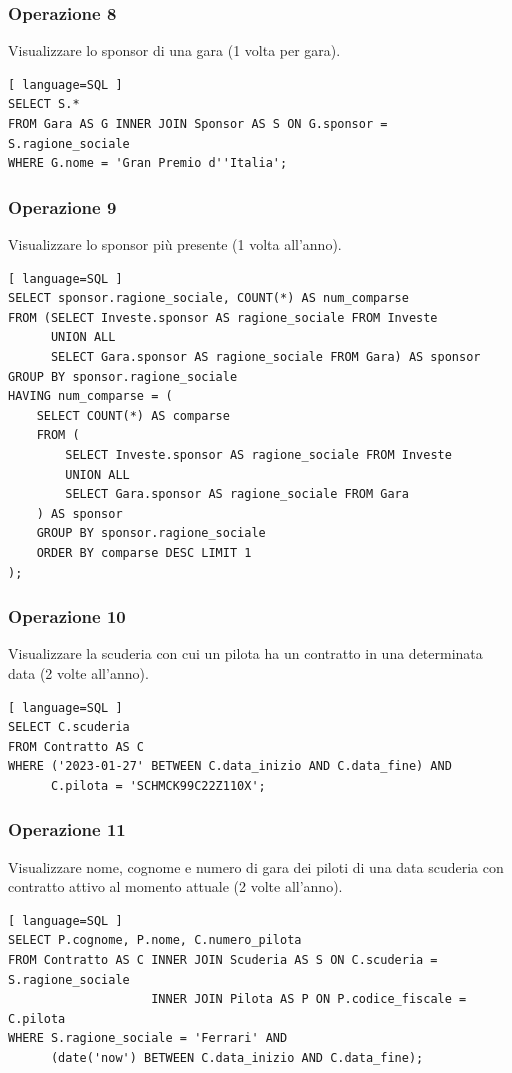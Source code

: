 \documentclass[11pt]{article}
\begin{document}
\subsubsection{Operazione 8}
Visualizzare lo sponsor di una gara (1 volta per gara).
\begin{lstlisting}[ language=SQL ]
SELECT S.*
FROM Gara AS G INNER JOIN Sponsor AS S ON G.sponsor = S.ragione_sociale
WHERE G.nome = 'Gran Premio d''Italia';
\end{lstlisting}


\subsubsection{Operazione 9}
Visualizzare lo sponsor più presente (1 volta all'anno).
\begin{lstlisting}[ language=SQL ]
SELECT sponsor.ragione_sociale, COUNT(*) AS num_comparse
FROM (SELECT Investe.sponsor AS ragione_sociale FROM Investe 
      UNION ALL 
      SELECT Gara.sponsor AS ragione_sociale FROM Gara) AS sponsor
GROUP BY sponsor.ragione_sociale
HAVING num_comparse = (
    SELECT COUNT(*) AS comparse
    FROM (
        SELECT Investe.sponsor AS ragione_sociale FROM Investe 
        UNION ALL 
        SELECT Gara.sponsor AS ragione_sociale FROM Gara
    ) AS sponsor
    GROUP BY sponsor.ragione_sociale
    ORDER BY comparse DESC LIMIT 1
);
\end{lstlisting}


\subsubsection{Operazione 10}
Visualizzare la scuderia con cui un pilota ha un contratto in una determinata data (2 volte all'anno).
\begin{lstlisting}[ language=SQL ]
SELECT C.scuderia
FROM Contratto AS C
WHERE ('2023-01-27' BETWEEN C.data_inizio AND C.data_fine) AND
      C.pilota = 'SCHMCK99C22Z110X';
\end{lstlisting}


\subsubsection{Operazione 11}
Visualizzare nome, cognome e numero di gara dei piloti di una data scuderia con contratto attivo al momento attuale (2 volte all'anno).
\begin{lstlisting}[ language=SQL ]
SELECT P.cognome, P.nome, C.numero_pilota
FROM Contratto AS C INNER JOIN Scuderia AS S ON C.scuderia = S.ragione_sociale 
                    INNER JOIN Pilota AS P ON P.codice_fiscale = C.pilota
WHERE S.ragione_sociale = 'Ferrari' AND
      (date('now') BETWEEN C.data_inizio AND C.data_fine);
\end{lstlisting}
\end{document}
